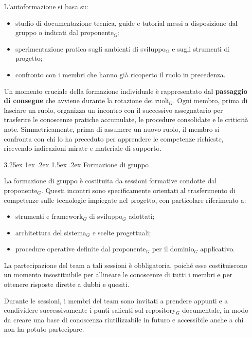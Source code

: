 \documentclass[a4paper, 10pt]{article}
\makeatletter
\renewcommand\paragraph{\@startsection{paragraph}{4}{\z@}%
  {3.25ex \@plus1ex \@minus .2ex}%
  {1.5ex \@plus .2ex}%
  {\normalfont\normalsize\bfseries}}
\makeatother
\begin{document}
L'autoformazione si basa su:
\begin{itemize}
    \item studio di documentazione tecnica, guide e tutorial messi a disposizione dal gruppo o indicati dal proponente$_G$;
    \item sperimentazione pratica sugli ambienti di sviluppo$_G$ e sugli strumenti di progetto;
    \item confronto con i membri che hanno già ricoperto il ruolo in precedenza.
\end{itemize}

Un momento cruciale della formazione individuale è rappresentato dal \textbf{passaggio di consegne} che avviene durante la rotazione dei ruoli$_G$. Ogni membro, prima di lasciare un ruolo, organizza un incontro con il successivo assegnatario per trasferire le conoscenze pratiche accumulate, le procedure consolidate e le criticità note. Simmetricamente, prima di assumere un nuovo ruolo, il membro si confronta con chi lo ha preceduto per apprendere le competenze richieste, ricevendo indicazioni mirate e materiale di supporto.

\paragraph{Formazione di gruppo}

La formazione di gruppo è costituita da sessioni formative condotte dal proponente$_G$. Questi incontri sono specificamente orientati al trasferimento di competenze sulle tecnologie impiegate nel progetto, con particolare riferimento a:
\begin{itemize}
    \item strumenti e framework$_G$ di sviluppo$_G$ adottati;
    \item architettura del sistema$_G$ e scelte progettuali;
    \item procedure operative definite dal proponente$_G$ per il dominio$_G$ applicativo.
\end{itemize}

La partecipazione del team a tali sessioni è obbligatoria, poiché esse costituiscono un momento insostituibile per allineare le conoscenze di tutti i membri e per ottenere risposte dirette a dubbi e quesiti.

Durante le sessioni, i membri del team sono invitati a prendere appunti e a condividere successivamente i punti salienti sul repository$_G$ documentale, in modo da creare una base di conoscenza riutilizzabile in futuro e accessibile anche a chi non ha potuto partecipare.
\end{document}
